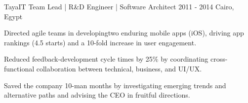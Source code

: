 \begin{cventries}





  \cventry
    {TayaIT} %
    {Team Lead | R\&D Engineer | Software Architect}
    {2011 - 2014} %
    {Cairo, Egypt} %
    {
      \begin{cvitems} %
		\item {Directed agile teams in developingtwo enduring mobile apps (iOS), driving app rankings (4.5 starts) and a 10-fold increase in user engagement.}
		\item {Reduced feedback-development cycle times by 25\% by coordinating cross-functional collaboration between technical, business, and UI/UX.}
		\item {Saved the company 10-man months by investigating emerging trends and alternative paths and advising the CEO in fruitful directions.}
      \end{cvitems}
    }





\end{cventries}

\vspace{-0.5ex}

